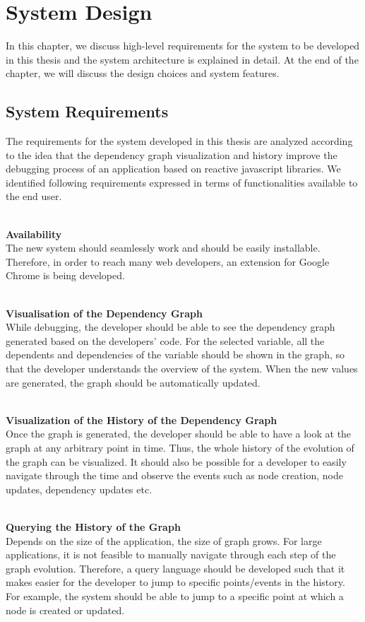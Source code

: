\chapter{System Design} \label{chap:System Design}
In this chapter, we discuss high-level requirements for the system to be developed in this thesis and the system architecture is explained in detail. 
At the end of the chapter, we will discuss the design choices and system features.

\section{System Requirements}
The requirements for the system developed in this thesis are analyzed according to the idea that the dependency graph visualization and history improve the debugging process of an application based on reactive javascript libraries. We identified following requirements expressed in terms of functionalities available to the end user.

\leavevmode
\\
\textbf{Availability}
\\
The new system should seamlessly work and should be easily installable. Therefore, in order to reach many web developers, an extension for Google Chrome is being developed. 

\leavevmode
\\
\textbf{Visualisation of the Dependency Graph}
\\
While debugging, the developer should be able to see the dependency graph generated based on the developers' code. For the selected variable, all the dependents and dependencies of the variable should be shown in the graph, so that the developer understands the overview of the system. 
When the new values are generated, the graph should be automatically updated.

\leavevmode
\\
\textbf{Visualization of the History of the Dependency Graph}
\\
Once the graph is generated, the developer should be able to have a look at the graph at any arbitrary point in time. Thus, the whole history of the evolution of the graph can be visualized. It should also be possible for a developer to easily navigate through the time and observe the events such as node creation, node updates, dependency updates etc.

\leavevmode
\\
\textbf{Querying the History of the Graph}
\\
Depends on the size of the application, the size of graph grows. For large applications, it is not feasible to manually navigate through each step of the graph evolution. Therefore, a query language should be developed such that it makes easier for the developer to jump to specific points/events in the history. For example, the system should be able to jump to a specific point at which a node is created or updated.

